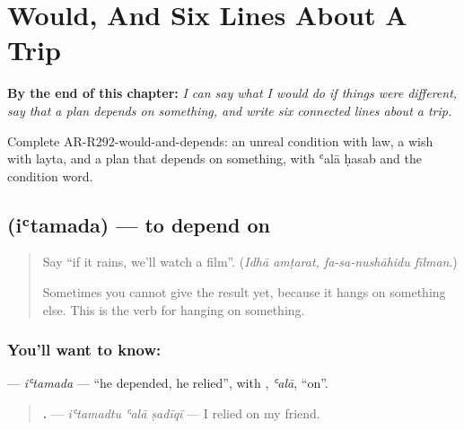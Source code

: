 
\chapter{Would, And Six Lines About A Trip}
\label{ch:ar-would-and-six-lines}

\begin{chapteropening}
\textbf{By the end of this chapter:} \emph{I can say what I would do if things were different, say that a plan depends on something, and write six connected lines about a trip.}

Complete AR-R292-would-and-depends: an unreal condition with law, a wish with layta, and a plan that depends on something, with ʿalā ḥasab and the condition word.
\end{chapteropening}

\section[\texorpdfstring{\ar{اعتمد} (iʿtamada)}{اعتمد (iʿtamada)}]{ (iʿtamada) — to depend on}

\label{lesson:AR-C292-itamada}



\begin{quote}
Say \textquotedblleft{}if it rains, we'll watch a film\textquotedblright{}. (\emph{Idhā amṭarat, fa-sa-nushāhidu fīlman}.)

Sometimes you cannot give the result yet, because it hangs on something else. This is the verb for hanging on something.
\end{quote}

\subsection*{You'll want to know: }
\textbf{} — \emph{iʿtamada} — \textquotedblleft{}he depended, he relied\textquotedblright{}, with \textbf{}, \emph{ʿalā}, \textquotedblleft{}on\textquotedblright{}.

\begin{quote}
\textbf{  .} — \emph{iʿtamadtu ʿalā ṣadīqī} — I relied on my friend.
\end{quote}

